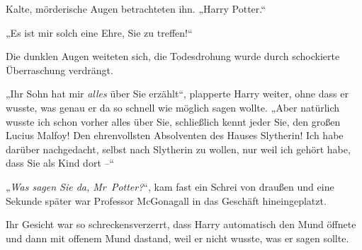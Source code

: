 Kalte, mörderische Augen betrachteten ihn. „Harry Potter.“

„Es ist mir solch eine Ehre, Sie zu treffen!“

Die dunklen Augen weiteten sich, die Todesdrohung wurde durch schockierte Überraschung verdrängt.

„Ihr Sohn hat mir \emph{alles} über Sie erzählt“, plapperte Harry weiter, ohne dass er wusste, was genau er da so schnell wie möglich sagen wollte. „Aber natürlich wusste ich schon vorher alles über Sie, schließlich kennt jeder Sie, den großen Lucius Malfoy! Den ehrenvollsten Absolventen des Hauses Slytherin! Ich habe darüber nachgedacht, selbst nach Slytherin zu wollen, nur weil ich gehört habe, dass Sie als Kind dort –“

„\emph{Was sagen Sie da, Mr~Potter?}“, kam fast ein Schrei von draußen und eine Sekunde später war Professor McGonagall in das Geschäft hineingeplatzt.

Ihr Gesicht war so schreckensverzerrt, dass Harry automatisch den Mund öffnete und dann mit offenem Mund dastand, weil er nicht wusste, was er sagen sollte.

